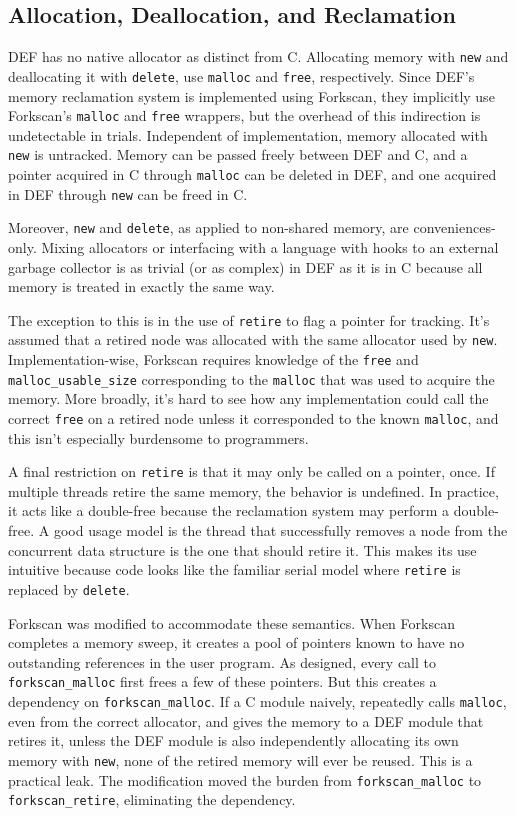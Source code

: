 \subsection{Allocation, Deallocation, and Reclamation}

DEF has no native allocator as distinct from C.  Allocating memory with \texttt{new} and deallocating it with \texttt{delete}, use \texttt{malloc} and \texttt{free}, respectively.  Since DEF's memory reclamation system is implemented using Forkscan, they implicitly use Forkscan's \texttt{malloc} and \texttt{free} wrappers, but the overhead of this indirection is undetectable in trials.  Independent of implementation, memory allocated with \texttt{new} is untracked.  Memory can be passed freely between DEF and C, and a pointer acquired in C through \texttt{malloc} can be deleted in DEF, and one acquired in DEF through \texttt{new} can be freed in C.

Moreover, \texttt{new} and \texttt{delete}, as applied to non-shared memory, are conveniences-only.  Mixing allocators or interfacing with a language with hooks to an external garbage collector is as trivial (or as complex) in DEF as it is in C because all memory is treated in exactly the same way.

The exception to this is in the use of \texttt{retire} to flag a pointer for tracking.  It's assumed that a retired node was allocated with the same allocator used by \texttt{new}.  Implementation-wise, Forkscan requires knowledge of the \texttt{free} and \texttt{malloc\_{}usable\_{}size} corresponding to the \texttt{malloc} that was used to acquire the memory.  More broadly, it's hard to see how any implementation could call the correct \texttt{free} on a retired node unless it corresponded to the known \texttt{malloc}, and this isn't especially burdensome to programmers.

A final restriction on \texttt{retire} is that it may only be called on a pointer, once.  If multiple threads retire the same memory, the behavior is undefined.  In practice, it acts like a double-free because the reclamation system may perform a double-free.  A good usage model is the thread that successfully removes a node from the concurrent data structure is the one that should retire it.  This makes its use intuitive because code looks like the familiar serial model where \texttt{retire} is replaced by \texttt{delete}.

Forkscan was modified to accommodate these semantics.  When Forkscan completes a memory sweep, it creates a pool of pointers known to have no outstanding references in the user program.  As designed, every call to \texttt{forkscan\_{}malloc} first frees a few of these pointers.  But this creates a dependency on \texttt{forkscan\_{}malloc}.  If a C module naively, repeatedly calls \texttt{malloc}, even from the correct allocator, and gives the memory to a DEF module that retires it, unless the DEF module is also independently allocating its own memory with \texttt{new}, none of the retired memory will ever be reused.  This is a practical leak.  The modification moved the burden from \texttt{forkscan\_{}malloc} to \texttt{forkscan\_retire}, eliminating the dependency.

